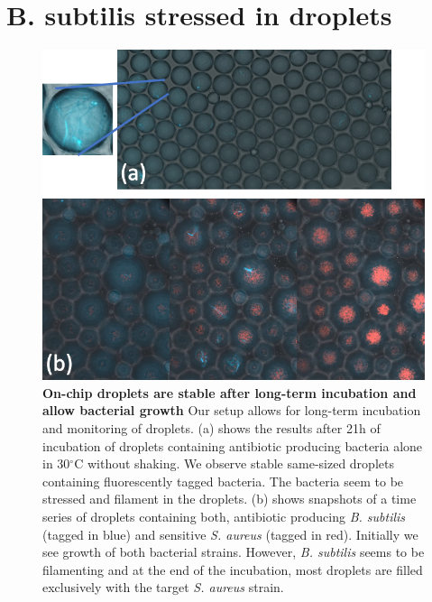 \section{B. subtilis stressed in droplets}
\begin{figure}
\centering
\includegraphics[width=\linewidth]{graphics/2025_09_28_droplets_fig5.png}
\caption{\textbf{On-chip droplets are stable after long-term incubation and allow bacterial growth} Our setup allows for long-term incubation and monitoring of droplets. (a) shows the results after 21h of incubation of droplets containing antibiotic producing bacteria alone in 30$^\circ$C without shaking. We observe stable same-sized droplets containing fluorescently tagged bacteria. The bacteria seem to be stressed and filament in the droplets. (b) shows snapshots of a time series of droplets containing both, antibiotic producing \textit{B. subtilis} (tagged in blue) and sensitive \textit{S. aureus} (tagged in red). Initially we see growth of both bacterial strains. However, \textit{B. subtilis} seems to be filamenting and at the end of the incubation, most droplets are filled exclusively with the target \textit{S. aureus} strain.}
\label{fig:results_incubation_subtilis}
\end{figure}
